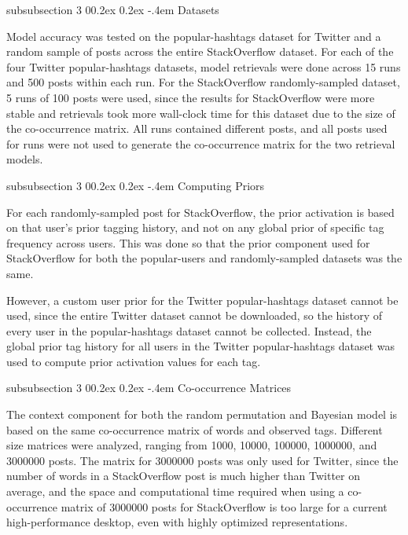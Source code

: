 \documentclass[man,floatsintext,donotrepeattitle]{apa6}
\makeatletter
\renewcommand{\subsubsection}{%
  \@startsection
  {subsubsection}%
  {3}%
  {\parindent}%
  {0\baselineskip \@plus 0.2ex \@minus 0.2ex}%
  {-.4em}%
  {\normalfont\normalsize\bfseries\addperi}}
\makeatother
\begin{document}
\subsubsection{Datasets}

Model accuracy was tested on the popular-hashtags dataset for Twitter and a random sample of posts across the entire StackOverflow dataset.
For each of the four Twitter popular-hashtags datasets, model retrievals were done across 15 runs and 500 posts within each run.
For the StackOverflow randomly-sampled dataset, 5 runs of 100 posts were used,
since the results for StackOverflow were more stable and retrievals took more wall-clock time for this dataset due to the size of the co-occurrence matrix.
All runs contained different posts, and all posts used for runs were not used to generate the co-occurrence matrix for the two retrieval models.

\subsubsection{Computing Priors}

For each randomly-sampled post for StackOverflow, the prior activation is based on that user's prior tagging history, and not on any global prior of specific tag frequency across users.
This was done so that the prior component used for StackOverflow for both the popular-users and randomly-sampled datasets was the same.

However, a custom user prior for the Twitter popular-hashtags dataset cannot be used, since the entire Twitter dataset cannot be downloaded, so the history of every user in the popular-hashtags dataset cannot be collected.
Instead, the global prior tag history for all users in the Twitter popular-hashtags dataset was used to compute prior activation values for each tag.

\subsubsection{Co-occurrence Matrices}

The context component for both the random permutation and Bayesian model is based on the same co-occurrence matrix of words and observed tags.
Different size matrices were analyzed, ranging from \num{1000}, \num{10000}, \num{100000}, \num{1000000}, and \num{3000000} posts.
The matrix for \num{3000000} posts was only used for Twitter, since the number of words in a StackOverflow post is much higher than Twitter on average,
and the space and computational time required when using a co-occurrence matrix of \num{3000000} posts for StackOverflow is too large for a current high-performance desktop, even with highly optimized representations.
\end{document}
